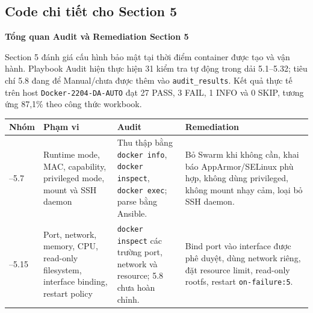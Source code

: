 \subsection{Code chi tiết cho Section 5}\label{phu-luc-code-section-5}

\noindent\textbf{Tổng quan Audit và Remediation Section 5}

Section 5 đánh giá cấu hình bảo mật tại thời điểm container được tạo và vận hành. Playbook Audit hiện thực hiện 31 kiểm tra tự động trong dải 5.1--5.32; tiêu chí 5.8 đang để Manual/chưa được thêm vào \texttt{audit\_results}. Kết quả thực tế trên host \texttt{Docker-2204-DA-AUTO} đạt 27 PASS, 3 FAIL, 1 INFO và 0 SKIP, tương ứng 87,1\% theo công thức workbook.

{\def\LTcaptype{none}
\begin{center}
\label{tab:tong-quan-section-5-phu-luc}
\end{center}
\begin{longtable}[]{@{}|
  >{\raggedright\arraybackslash}p{}|
  >{\raggedright\arraybackslash}p{}|
  >{\raggedright\arraybackslash}p{}|
  >{\raggedright\arraybackslash}p{}|@{}}
\hline
\begin{minipage}[b]{\linewidth}\raggedright
\textbf{Nhóm}
\end{minipage} & \begin{minipage}[b]{\linewidth}\raggedright
\textbf{Phạm vi}
\end{minipage} & \begin{minipage}[b]{\linewidth}\raggedright
\textbf{Audit}
\end{minipage} & \begin{minipage}[b]{\linewidth}\raggedright
\textbf{Remediation}
\end{minipage} \\
\hline
\endhead
5.1--5.7 & Runtime mode, MAC, capability, privileged mode, mount và SSH daemon & Thu thập bằng \texttt{docker info}, \texttt{docker inspect}, \texttt{docker exec}; parse bằng Ansible. & Bỏ Swarm khi không cần, khai báo AppArmor/SELinux phù hợp, không dùng privileged, không mount nhạy cảm, loại bỏ SSH daemon. \\
\hline
5.8--5.15 & Port, network, memory, CPU, read-only filesystem, interface binding, restart policy & \texttt{docker inspect} các trường port, network và resource; 5.8 chưa hoàn chỉnh. & Bind port vào interface được phê duyệt, dùng network riêng, đặt resource limit, read-only rootfs, restart \texttt{on-failure:5}. \\

\end{longtable}}
